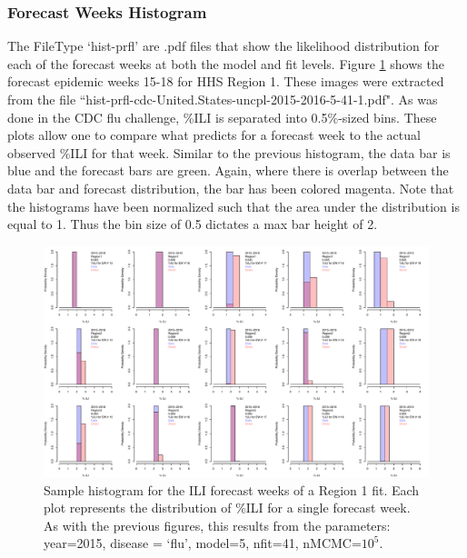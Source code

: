 \documentclass[a4paper]{article}
\begin{document}
\subsubsection{Forecast Weeks Histogram}
The FileType `hist-prfl' are .pdf files that show the likelihood distribution for each of the forecast weeks at both the model and fit levels.  Figure \ref{fig:hist_fore} shows the forecast epidemic weeks 15-18 for HHS Region 1.  These images were extracted from the file ``hist-prfl-cdc-United.States-uncpl-2015-2016-5-41-1.pdf".  As was done in the CDC flu challenge, \%ILI is separated into 0.5\%-sized bins.  These plots allow one to compare what  predicts for a forecast week to the actual observed \%ILI for that week.  Similar to the previous histogram, the data bar is blue and the forecast bars are green.  Again, where there is overlap between the data bar and forecast distribution, the bar has been colored magenta.  Note that the histograms have been normalized such that the area under the distribution is equal to 1.  Thus the bin size of 0.5 dictates a max bar height of 2.
\begin{figure}[htbp]
  \centering
  \includegraphics[width=\linewidth]{figures/Reg1_2015_hist_forcast.pdf}
  \caption{Sample histogram for the ILI forecast weeks of a Region 1 fit. Each plot represents the distribution of \%ILI for a single forecast week.  As with the previous figures, this results from the parameters: year=2015, disease = `flu', model=5, nfit=41, nMCMC=$10^5$.}
  \label{fig:hist_fore}
\end{figure}
\end{document}
